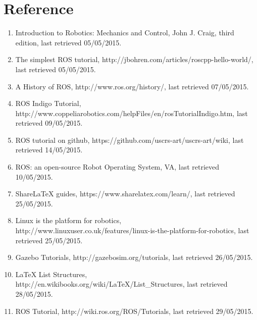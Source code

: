 \documentclass[pdftex,12pt,a4paper]{article}
\begin{document}
  \section{Reference}
  \begin{enumerate}
  \item Introduction to Robotics: Mechanics and Control, John J. Craig, third edition, last retrieved 05/05/2015.
  \item The simplest ROS tutorial, http://jbohren.com/articles/roscpp-hello-world/, last retrieved 05/05/2015.
  \item A History of ROS, http://www.ros.org/history/, last retrieved 07/05/2015.
  \item ROS Indigo Tutorial, http://www.coppeliarobotics.com/helpFiles/en/rosTutorialIndigo.htm, last retrieved 09/05/2015.
  \item ROS tutorial on github, https://github.com/uscrs-art/uscrs-art/wiki, last retrieved 14/05/2015.
  \item ROS: an open-source Robot Operating System, VA, last retrieved 10/05/2015.
  \item ShareLaTeX guides, https://www.sharelatex.com/learn/, last retrieved 25/05/2015.\
  \item Linux is the platform for robotics, http://www.linuxuser.co.uk/features/linux-is-the-platform-for-robotics, last retrieved 25/05/2015.
  \item Gazebo Tutorials, http://gazebosim.org/tutorials, last retrieved 26/05/2015.
  \item LaTeX List Structures, http://en.wikibooks.org/wiki/LaTeX/List\_Structures, last retrieved 28/05/2015.
  \item ROS Tutorial, http://wiki.ros.org/ROS/Tutorials, last retrieved 29/05/2015.
  \end{enumerate}
  
\end{document}
